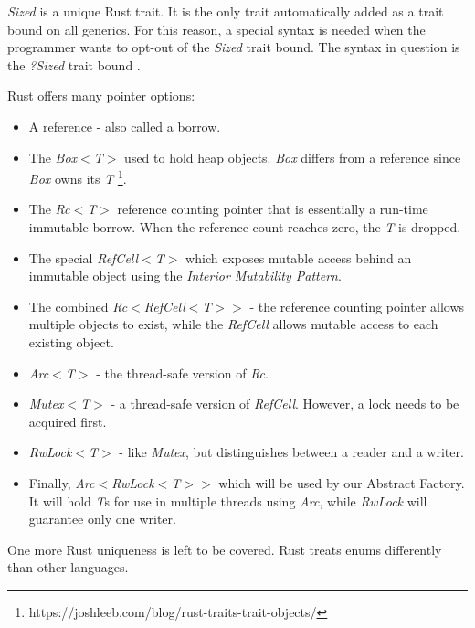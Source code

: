 \begin{notebox}
	\textit{Sized} is a unique Rust trait.
	It is the only trait automatically added as a trait bound on all generics.
	For this reason, a special syntax is needed when the programmer wants to opt-out of the \textit{Sized} trait bound.
	The syntax in question is the \textit{?Sized} trait bound \cite{klabnik_2019_01}.
\end{notebox}

Rust offers many pointer options: \cite{klabnik_2019_01}
\begin{itemize}
	\item A reference - also called a borrow.
	\item The \textit{Box$<$T$>$} used to hold heap objects.
	      \textit{Box} differs from a reference since \textit{Box} owns its \textit{T} \footnote{https://joshleeb.com/blog/rust-traits-trait-objects/}.
	\item The \textit{Rc$<$T$>$} reference counting pointer that is essentially a run-time immutable borrow.
	      When the reference count reaches zero, the \textit{T} is dropped.
	\item The special \textit{RefCell$<$T$>$} which exposes mutable access behind an immutable object using the \textit{Interior Mutability Pattern}.
	\item The combined \textit{Rc$<$RefCell$<$T$>$$>$} - the reference counting pointer allows multiple objects to exist, while the \textit{RefCell} allows mutable access to each existing object.
	\item \textit{Arc$<$T$>$} - the thread-safe version of \textit{Rc}.
	\item \textit{Mutex$<$T$>$} - a thread-safe version of \textit{RefCell}.
	      However, a lock needs to be acquired first.
	\item \textit{RwLock$<$T$>$} - like \textit{Mutex}, but distinguishes between a reader and a writer.
	\item Finally, \textit{Arc$<$RwLock$<$T$>$$>$} which will be used by our Abstract Factory.
	      It will hold \textit{T}s for use in multiple threads using \textit{Arc}, while \textit{RwLock} will guarantee only one writer.
\end{itemize}

One more Rust uniqueness is left to be covered. Rust treats enums differently than other languages.

